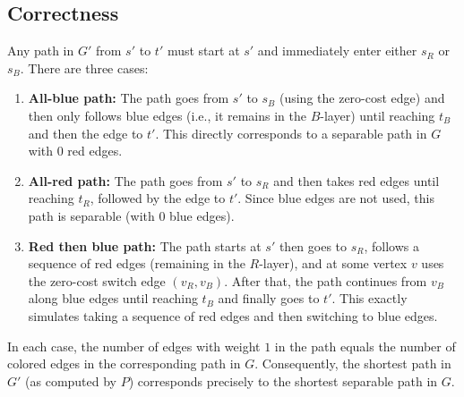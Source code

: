\documentclass[11pt]{article}
\begin{document}
    \subsection*{Correctness}
    Any path in \(G'\) from \(s'\) to \(t'\) must start at \(s'\) and immediately enter either \(s_R\) or \(s_B\). There are three cases:
    \begin{enumerate}
      \item \textbf{All-blue path:} The path goes from \(s'\) to \(s_B\) (using the zero-cost edge) and then only follows blue edges (i.e., it remains in the \(B\)-layer) until reaching \(t_B\) and then the edge to \(t'\). This directly corresponds to a separable path in \(G\) with \(0\) red edges.
      
      \item \textbf{All-red path:} The path goes from \(s'\) to \(s_R\) and then takes red edges until reaching \(t_R\), followed by the edge to \(t'\). Since blue edges are not used, this path is separable (with \(0\) blue edges).
      
      \item \textbf{Red then blue path:} The path starts at \(s'\) then goes to \(s_R\), follows a sequence of red edges (remaining in the \(R\)-layer), and at some vertex \(v\) uses the zero-cost switch edge \((v_R, v_B)\). After that, the path continues from \(v_B\) along blue edges until reaching \(t_B\) and finally goes to \(t'\). This exactly simulates taking a sequence of red edges and then switching to blue edges.
    \end{enumerate}
    In each case, the number of edges with weight \(1\) in the path equals the number of colored edges in the corresponding path in \(G\). Consequently, the shortest path in \(G'\) (as computed by \(P\)) corresponds precisely to the shortest separable path in \(G\).
    
\end{document}
